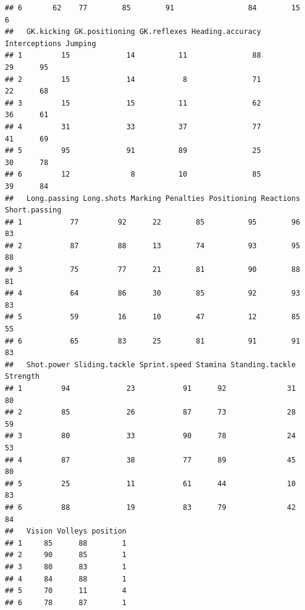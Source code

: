 \documentclass[
]{article}
\theoremstyle{definition}
\theoremstyle{definition}
\theoremstyle{definition}
\theoremstyle{definition}
\theoremstyle{remark}
\begin{document}
\begin{verbatim}
## 6       62    77        85        91                 84        15           6
##   GK.kicking GK.positioning GK.reflexes Heading.accuracy Interceptions Jumping
## 1         15             14          11               88            29      95
## 2         15             14           8               71            22      68
## 3         15             15          11               62            36      61
## 4         31             33          37               77            41      69
## 5         95             91          89               25            30      78
## 6         12              8          10               85            39      84
##   Long.passing Long.shots Marking Penalties Positioning Reactions Short.passing
## 1           77         92      22        85          95        96            83
## 2           87         88      13        74          93        95            88
## 3           75         77      21        81          90        88            81
## 4           64         86      30        85          92        93            83
## 5           59         16      10        47          12        85            55
## 6           65         83      25        81          91        91            83
##   Shot.power Sliding.tackle Sprint.speed Stamina Standing.tackle Strength
## 1         94             23           91      92              31       80
## 2         85             26           87      73              28       59
## 3         80             33           90      78              24       53
## 4         87             38           77      89              45       80
## 5         25             11           61      44              10       83
## 6         88             19           83      79              42       84
##   Vision Volleys position
## 1     85      88        1
## 2     90      85        1
## 3     80      83        1
## 4     84      88        1
## 5     70      11        4
## 6     78      87        1
\end{verbatim}
\end{document}
